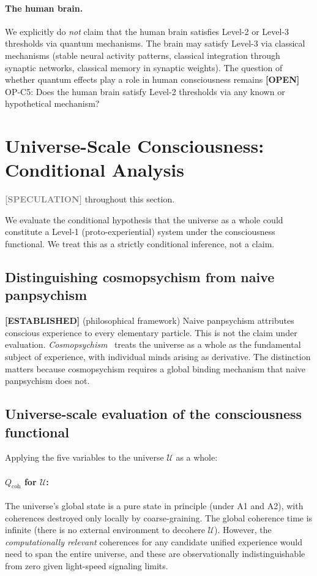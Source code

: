 \documentclass[12pt,letterpaper]{article}
\newcommand{\ESTABLISHED}[1]{\textcolor{green!50!black}{\textbf{[ESTABLISHED]}} #1}
\newcommand{\OPEN}[1]{\textcolor{red!70!black}{\textbf{[OPEN]}} #1}
\newcommand{\SPECULATION}[1]{\textcolor{gray}{\textbf{[SPECULATION]}} #1}
\newcommand{\Qcoh}{Q_{\mathrm{coh}}}
\begin{document}
\paragraph{The human brain.} We explicitly do \emph{not} claim that the human
brain satisfies Level-2 or Level-3 thresholds via quantum mechanisms. The
brain may satisfy Level-3 via classical mechanisms (stable neural activity
patterns, classical integration through synaptic networks, classical memory
in synaptic weights). The question of whether quantum effects play a role
in human consciousness remains \OPEN{OP-C5: Does the human brain satisfy
Level-2 thresholds via any known or hypothetical mechanism?}

\section{Universe-Scale Consciousness: Conditional Analysis}
\label{sec:universe}

\SPECULATION{} throughout this section.

We evaluate the conditional hypothesis that the universe as a whole could
constitute a Level-1 (proto-experiential) system under the consciousness
functional. We treat this as a strictly conditional inference, not a claim.

\subsection{Distinguishing cosmopsychism from naive panpsychism}

\ESTABLISHED{} (philosophical framework) Naive panpsychism attributes
conscious experience to every elementary particle. This is not the claim
under evaluation. \emph{Cosmopsychism}~\cite{Goff2017} treats the universe
as a whole as the fundamental subject of experience, with individual minds
arising as derivative. The distinction matters because cosmopsychism
requires a global binding mechanism that naive panpsychism does not.

\subsection{Universe-scale evaluation of the consciousness functional}

Applying the five variables to the universe $\mathcal{U}$ as a whole:

\paragraph{$\Qcoh$ for $\mathcal{U}$:} The universe's global state is a
pure state in principle (under A1 and A2), with coherences destroyed
only locally by coarse-graining. The global coherence time is infinite
(there is no external environment to decohere $\mathcal{U}$). However,
the \emph{computationally relevant} coherences for any candidate unified
experience would need to span the entire universe, and these are
observationally indistinguishable from zero given light-speed signaling limits.
\end{document}
